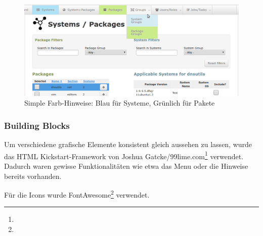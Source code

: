 \begin{figure}[H]
	\centering
	\includegraphics[width=\linewidth]{files/colors_pkg_sys}
	\caption{Simple Farb-Hinweise: Blau für Systeme, Grünlich für Pakete}
	\label{fig:design:color-code}
\end{figure}

\subsubsection*{Building Blocks}

Um verschiedene grafische Elemente konsistent gleich aussehen zu lassen, wurde das HTML Kickstart-Framework von Joshua Gatcke/99lime.com\footnote{} verwendet. Dadurch waren gewisse Funktionalitäten wie etwa das Menu oder die Hinweise bereits vorhanden.


Für die Icons wurde FontAwesome\footnote{} verwendet.
